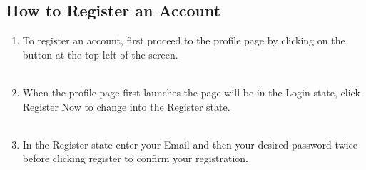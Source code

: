 \documentclass[12pt,a4paper]{article}
\begin{document}
			\subsection{How to Register an Account}
				\begin{enumerate}
					\item To register an account, first proceed to the profile page by clicking on the button at 
						the top left of the screen.\\\\
					\item When the profile page first launches the page will be in the Login state, 
						click Register Now to change into the Register state.\\\\
						\newpage
					\item In the Register state enter your Email and then your desired password twice before clicking 
						register to confirm your registration.\\\\

\end{enumerate}
\end{document}
